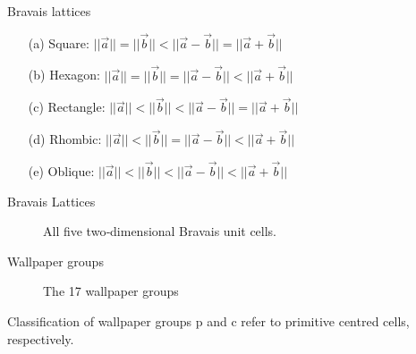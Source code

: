 \documentclass{beamer}
\begin{document}
\begin{frame}{Bravais lattices}
    \begin{enumerate}
        \item[(a)] Square:\hspace*{14pt} $||\vec{a}||=||\vec{b}|| < ||\vec{a}-\vec{b}|| = ||\vec{a}+\vec{b}||$

        \item[(b)] Hexagon:\hspace*{7pt} $||\vec{a}||=||\vec{b}|| = ||\vec{a}-\vec{b}|| < ||\vec{a}+\vec{b}||$

        \item[(c)] Rectangle: $||\vec{a}||<||\vec{b}|| < ||\vec{a}-\vec{b}|| = ||\vec{a}+\vec{b}||$

        \item[(d)] Rhombic:\hspace*{5pt} $||\vec{a}||<||\vec{b}|| = ||\vec{a}-\vec{b}|| < ||\vec{a}+\vec{b}||$

        \item[(e)] Oblique:\hspace*{9pt} $||\vec{a}||<||\vec{b}|| < ||\vec{a}-\vec{b}|| < ||\vec{a}+\vec{b}||$
    \end{enumerate}
\end{frame}

\begin{frame}{Bravais Lattices}
    \begin{figure}
        \centering
        
        \caption{All five two‐dimensional Bravais unit cells.}
        \label{fig:bravis-lattices}
    \end{figure}
\end{frame}



\begin{frame}{Wallpaper groups}
    \begin{figure}
        \centering
        
        \caption{The 17 wallpaper groups }
        \label{fig:17WallpaperGroups}
    \end{figure}
\end{frame}

\begin{frame}{Classification of wallpaper groups}
    p and c refer to primitive centred cells, respectively.

\end{frame}
\end{document}
